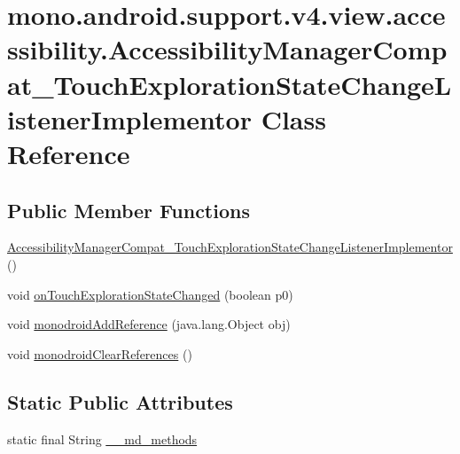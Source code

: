\hypertarget{classmono_1_1android_1_1support_1_1v4_1_1view_1_1accessibility_1_1_accessibility_manager_compat_9bd6a396809ffec70e161c1567d2a373}{
\section{mono.android.support.v4.view.accessibility.AccessibilityManagerCompat\_\-TouchExplorationStateChangeListenerImplementor Class Reference}
\label{classmono_1_1android_1_1support_1_1v4_1_1view_1_1accessibility_1_1_accessibility_manager_compat_9bd6a396809ffec70e161c1567d2a373}
}
\subsection*{Public Member Functions}
\begin{CompactItemize}
\item 
\hyperlink{classmono_1_1android_1_1support_1_1v4_1_1view_1_1accessibility_1_1_accessibility_manager_compat_9bd6a396809ffec70e161c1567d2a373_70870b0d045f2660907b0639993c323e}{AccessibilityManagerCompat\_\-TouchExplorationStateChangeListenerImplementor} ()
\item 
void \hyperlink{classmono_1_1android_1_1support_1_1v4_1_1view_1_1accessibility_1_1_accessibility_manager_compat_9bd6a396809ffec70e161c1567d2a373_bbf61e7546b08cf0d159de6aea819833}{onTouchExplorationStateChanged} (boolean p0)
\item 
void \hyperlink{classmono_1_1android_1_1support_1_1v4_1_1view_1_1accessibility_1_1_accessibility_manager_compat_9bd6a396809ffec70e161c1567d2a373_646b0cb4c9332288a6d51479147d0466}{monodroidAddReference} (java.lang.Object obj)
\item 
void \hyperlink{classmono_1_1android_1_1support_1_1v4_1_1view_1_1accessibility_1_1_accessibility_manager_compat_9bd6a396809ffec70e161c1567d2a373_a27a317e4acec5bb2ce6981d96dbaffe}{monodroidClearReferences} ()
\end{CompactItemize}
\subsection*{Static Public Attributes}
\begin{CompactItemize}
\item 
static final String \hyperlink{classmono_1_1android_1_1support_1_1v4_1_1view_1_1accessibility_1_1_accessibility_manager_compat_9bd6a396809ffec70e161c1567d2a373_7ff154717c3c87fe44c86880eea2ab12}{\_\-\_\-md\_\-methods}
\end{CompactItemize}
